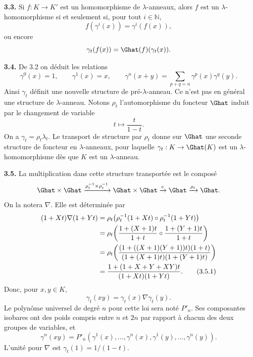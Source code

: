 \documentclass[11pt]{article}
\begin{document}
\textbf{3.3.} Si \(f:K\to K'\) est un homomorphisme de \(\lambda\)-anneaux, alors \(f\) est un \(\lambda\)-homomorphisme si et seulement si, pour tout \(i\in\mathbb N\),
\[
  f(\gamma^i(x))=\gamma^i(f(x)),
\]
ou encore
\[
  \gamma_t(f(x))=\Ghat(f)(\gamma_t(x)).
\]

\textbf{3.4.} De 3.2 on déduit les relations
\begin{equation}\tag{3.4.1}
  \gamma^0(x)=1,
  \qquad \gamma^1(x)=x,
  \qquad \gamma^n(x+y)=\sum_{p+q=n}\gamma^p(x)\gamma^q(y).
\end{equation}
Ainsi \(\gamma_t\) définit une nouvelle structure de pré-\(\lambda\)-anneau. Ce n'est pas en général une structure de \(\lambda\)-anneau. Notons \(\rho_t\) l'automorphisme du foncteur \(\Ghat\) induit par le changement de variable
\[
  t\longmapsto \frac{t}{1-t}.
\]
On a \(\gamma_t=\rho_t\lambda_t\). Le transport de structure par \(\rho_t\) donne sur \(\Ghat\) une seconde structure de foncteur en \(\lambda\)-anneaux, pour laquelle \(\gamma_t:K\to\Ghat(K)\) est un \(\lambda\)-homomorphisme dès que \(K\) est un \(\lambda\)-anneau.

\textbf{3.5.} La multiplication dans cette structure transportée est le composé
\[
  \Ghat\times\Ghat\xrightarrow{\rho_t^{-1}\times\rho_t^{-1}}
  \Ghat\times\Ghat\xrightarrow{\circ}\Ghat\xrightarrow{\rho_t}\Ghat .
\]
On la notera \(\nabla\). Elle est déterminée par
\begin{align}
 (1+Xt)\nabla(1+Yt)
 &=\rho_t\!\left(\rho_t^{-1}(1+Xt)\circ\rho_t^{-1}(1+Yt)\right) \notag\\
 &=\rho_t\!\left(\frac{1+(X+1)t}{1+t}\circ
                 \frac{1+(Y+1)t}{1+t}\right) \notag\\
 &=\rho_t\!\left(\frac{(1+((X+1)(Y+1))t)(1+t)}
                      {(1+(X+1)t)(1+(Y+1)t)}\right) \notag\\
 &=\frac{1+(1+X+Y+XY)t}{(1+Xt)(1+Yt)} . \tag{3.5.1}
\end{align}
Donc, pour \(x,y\in K\),
\begin{equation}\tag{3.5.2}
  \gamma_t(xy)=\gamma_t(x)\nabla\gamma_t(y).
\end{equation}
Le polynôme universel de degré \(n\) pour cette loi sera noté \(P'_n\). Ses composantes isobares ont des poids compris entre \(n\) et \(2n\) par rapport à chacun des deux groupes de variables, et
\begin{equation}\tag{3.5.3}
  \gamma^n(xy)
  =P'_n(\gamma^1(x),\ldots,\gamma^n(x),
       \gamma^1(y),\ldots,\gamma^n(y)).
\end{equation}
L'unité pour \(\nabla\) est \(\gamma_t(1)=1/(1-t)\).
\end{document}
